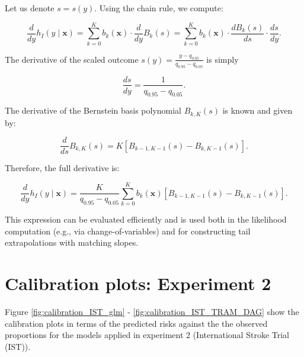 Let us denote \( s = s(y) \). Using the chain rule, we compute:

\begin{equation}
\frac{d}{dy} h_I(y \mid \mathbf{x}) = \sum_{k=0}^{K} b_k(\mathbf{x}) \cdot \frac{d}{dy} B_k(s) = \sum_{k=0}^{K} b_k(\mathbf{x}) \cdot \frac{dB_k(s)}{ds} \cdot \frac{ds}{dy}.
\end{equation}

The derivative of the scaled outcome \( s(y) = \frac{y - q_{0.05}}{q_{0.95} - q_{0.05}} \) is simply

\begin{equation}
\frac{ds}{dy} = \frac{1}{q_{0.95} - q_{0.05}}.
\end{equation}

The derivative of the Bernstein basis polynomial \( B_{k,K}(s) \) is known and given by:

\begin{equation}
\frac{d}{ds} B_{k,K}(s) = K \left[ B_{k-1,K-1}(s) - B_{k,K-1}(s) \right].
\end{equation}

Therefore, the full derivative is:

\begin{equation}
\frac{d}{dy} h_I(y \mid \mathbf{x}) = \frac{K}{q_{0.95} - q_{0.05}} \sum_{k=0}^{K} b_k(\mathbf{x}) \left[ B_{k-1,K-1}(s) - B_{k,K-1}(s) \right].
\end{equation}

This expression can be evaluated efficiently and is used both in the likelihood computation (e.g., via change-of-variables) and for constructing tail extrapolations with matching slopes.




\section{Calibration plots: Experiment 2} \label{sec:calibrations_experiment2}

Figure \ref{fig:calibration_IST_glm} - \ref{fig:calibration_IST_TRAM_DAG} show the calibration plots in terms of the predicted risks against the the observed proportions for the models applied in experiment 2 (International Stroke Trial (IST)). 

